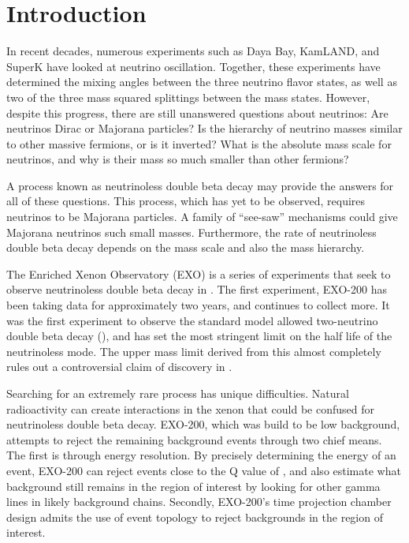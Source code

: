 \documentclass[herrin-thesis.tex]{subfiles}
\begin{document}
\chapter{Introduction}

In recent decades, numerous experiments such as Daya Bay, KamLAND, and SuperK  have looked at neutrino oscillation. Together, these experiments have determined the mixing angles between the three neutrino flavor states, as well as two of the three mass squared splittings between the mass states. However, despite this progress, there are still unanswered questions about neutrinos: Are neutrinos Dirac or Majorana particles? Is the hierarchy of neutrino masses similar to other massive fermions, or is it inverted? What is the absolute mass scale for neutrinos, and why is their mass so much smaller than other fermions?

A process known as neutrinoless double beta decay may provide the answers for all of these questions. This process, which has yet to be observed, requires neutrinos to be Majorana particles. A family of ``see-saw'' mechanisms could give Majorana neutrinos such small masses. Furthermore, the rate of neutrinoless double beta decay depends on the mass scale and also the mass hierarchy.

The Enriched Xenon Observatory (EXO) is a series of experiments that seek to observe neutrinoless double beta decay in . The first experiment, EXO-200 has been taking data for approximately two years, and continues to collect more. It was the first experiment to observe the standard model allowed two-neutrino double beta decay (\twonu)\cite{Ackerman:2011gz}, and has set the most stringent limit on the half life of the neutrinoless mode\cite{Auger:2012ar}. The upper mass limit derived from this almost completely rules out a controversial claim of discovery in .

Searching for an extremely rare process has unique difficulties. Natural radioactivity can create interactions in the xenon that could be confused for neutrinoless double beta decay. EXO-200, which was build to be low background, attempts to reject the remaining background events through two chief means. The first is through energy resolution. By precisely determining the energy of an event, EXO-200 can reject events close to the Q value of , and also estimate what background still remains in the region of interest by looking for other gamma lines in likely background chains. Secondly, EXO-200's time projection chamber design admits the use of event topology to reject backgrounds in the region of interest.
\end{document}
